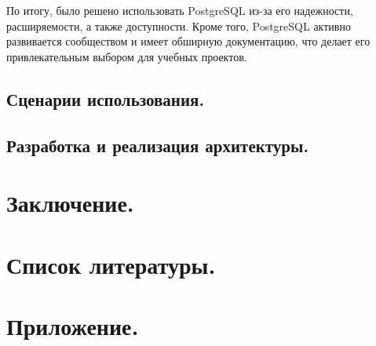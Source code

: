 \documentclass[12pt, russian]{extarticle}
\begin{document}
\begin{spacing}{1.5}
    По итогу, было решено использовать PostgreSQL из-за его надежности, расширяемости, а также доступности.
    Кроме того, PostgreSQL активно развивается сообществом и имеет обширную документацию,
    что делает его привлекательным выбором для учебных проектов.

    \newpage
    \subsection{Сценарии использования.}

    

    \newpage
    \subsection{Разработка и реализация архитектуры.}

    \newpage
    \section{Заключение.}

    \newpage
    \section{Список литературы.}

    \newpage
    \section{Приложение.}

    \end{spacing}
\end{document}
